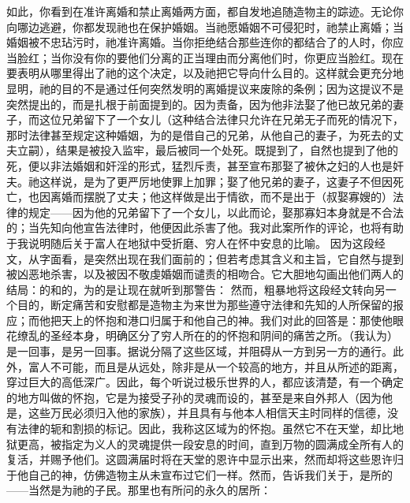 如此，你看到在准许离婚和禁止离婚两方面，都自发地追随造物主的踪迹。无论你向哪边逃避，你都发现祂也在保护婚姻。当祂愿婚姻不可侵犯时，祂禁止离婚；当婚姻被不忠玷污时，祂准许离婚。当你拒绝结合那些连你的都结合了的人时，你应当脸红；当你没有你的要他们分离的正当理由而分离他们时，你更应当脸红。现在要表明从哪里得出了祂的这个决定，以及祂把它导向什么目的。这样就会更充分地显明，祂的目的不是通过任何突然发明的离婚提议来废除的条例；因为这提议不是突然提出的，而是扎根于前面提到的。因为责备，因为他非法娶了他已故兄弟的妻子，而这位兄弟留下了一个女儿（这种结合法律只允许在兄弟无子而死的情况下，那时法律甚至规定这种婚姻，为的是借自己的兄弟，从他自己的妻子，为死去的丈夫立嗣），结果是被投入监牢，最后被同一个处死。既提到了，自然也提到了他的死，便以非法婚姻和奸淫的形式，猛烈斥责，甚至宣布那娶了被休之妇的人也是奸夫。祂这样说，是为了更严厉地使罪上加罪；娶了他兄弟的妻子，这妻子不但因死亡，也因离婚而摆脱了丈夫；他这样做是出于情欲，而不是出于（叔娶寡嫂的）法律的规定——因为他的兄弟留下了一个女儿，以此而论，娶那寡妇本身就是不合法的；当先知向他宣告法律时，他便因此杀害了他。我对此案所作的评论，也将有助于我说明随后关于富人在地狱中受折磨、穷人在怀中安息的比喻。 因为这段经文，从字面看，是突然出现在我们面前的；但若考虑其含义和主旨，它自然与提到被凶恶地杀害，以及被因不敬虔婚姻而谴责的相吻合。它大胆地勾画出他们两人的结局：的和的，为的是让现在就听到那警告： 然而，粗暴地将这段经文转向另一个目的，断定痛苦和安慰都是造物主为来世为那些遵守法律和先知的人所保留的报应；而他把天上的怀抱和港口归属于和他自己的神。我们对此的回答是：那使他眼花缭乱的圣经本身，明确区分了穷人所在的的怀抱和阴间的痛苦之所。（我认为）是一回事，是另一回事。据说分隔了这些区域，并阻碍从一方到另一方的通行。此外，富人不可能，而且是从远处，除非是从一个较高的地方，并且从所述的距离，穿过巨大的高低深广。因此，每个听说过极乐世界的人，都应该清楚，有一个确定的地方叫做的怀抱，它是为接受子孙的灵魂而设的，甚至是来自外邦人（因为他是，这些万民必须归入他的家族），并且具有与他本人相信天主时同样的信德，没有法律的轭和割损的标记。因此，我称这区域为的怀抱。虽然它不在天堂，却比地狱更高，被指定为义人的灵魂提供一段安息的时间，直到万物的圆满成全所有人的复活，并赐予他们。这圆满届时将在天堂的恩许中显示出来，然而却将这些恩许归于他自己的神，仿佛造物主从未宣布过它们一样。然而，告诉我们关于，是所的——当然是为祂的子民。那里也有所问的永久的居所： 